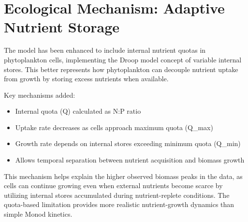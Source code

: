 \section{Ecological Mechanism: Adaptive Nutrient Storage}

The model has been enhanced to include internal nutrient quotas in phytoplankton cells, implementing the Droop model concept of variable internal stores. This better represents how phytoplankton can decouple nutrient uptake from growth by storing excess nutrients when available.

Key mechanisms added:
\begin{itemize}
    \item Internal quota (Q) calculated as N:P ratio
    \item Uptake rate decreases as cells approach maximum quota (Q\_max)
    \item Growth rate depends on internal stores exceeding minimum quota (Q\_min)
    \item Allows temporal separation between nutrient acquisition and biomass growth
\end{itemize}

This mechanism helps explain the higher observed biomass peaks in the data, as cells can continue growing even when external nutrients become scarce by utilizing internal stores accumulated during nutrient-replete conditions. The quota-based limitation provides more realistic nutrient-growth dynamics than simple Monod kinetics.
